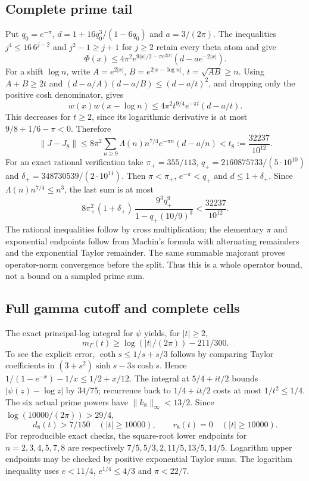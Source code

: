 \documentclass[11pt]{article}
\numberwithin{equation}{section}
\begin{document}
\subsection{Complete prime tail}
Put $q_0=e^{-\pi}$, $d=1+16q_0^3/(1-6q_0)$ and $a=3/(2\pi)$.
The inequalities $j^4\le16\,6^{j-2}$ and $j^2-1\ge j+1$ for $j\ge2$
retain every theta atom and give
\[
 \Phi(x)\le4\pi^2e^{9|x|/2-\pi e^{2|x|}}(d-ae^{-2|x|}).
\]
For a shift $\log n$, write $A=e^{2|x|}$, $B=e^{2|x-\log n|}$,
$t=\sqrt{AB}\ge n$. Using $A+B\ge2t$ and
$(d-a/A)(d-a/B)\le(d-a/t)^2$, and dropping only the positive
cosh denominator, gives
\[
 w(x)w(x-\log n)\le4\pi^2t^{9/4}e^{-\pi t}(d-a/t).
\]
This decreases for $t\ge2$, since its logarithmic derivative is at
most $9/8+1/6-\pi<0$. Therefore
\begin{equation}\label{primebound}
 \|J-J_8\|\le8\pi^2\sum_{n\ge9}
       \Lambda(n)n^{7/4}e^{-\pi n}(d-a/n)
       <t_8:=\frac{32237}{10^{12}}.
\end{equation}
For an exact rational verification take
$\pi_+=355/113$, $q_+=2160875733/(5\cdot10^{10})$ and
$\delta_+=348730539/(2\cdot10^{11})$. Then $\pi<\pi_+$,
$e^{-\pi}<q_+$ and $d\le1+\delta_+$. Since
$\Lambda(n)n^{7/4}\le n^3$, the last sum is at most
\[
 8\pi_+^2(1+\delta_+)\,
       \frac{9^3q_+^9}{1-q_+(10/9)^3}<\frac{32237}{10^{12}}.
\]
The rational inequalities follow by cross multiplication; the elementary
$\pi$ and exponential endpoints follow from Machin's formula with
alternating remainders and the exponential Taylor remainder. The same
summable majorant proves operator-norm convergence before the split.
Thus this is a whole operator bound, not a bound on a sampled prime sum.

\subsection{Full gamma cutoff and complete cells}
The exact principal-log integral for $\psi$ \cite[5.9.13]{DLMF}
yields, for $|t|\ge2$,
\[
 m_\Gamma(t)\ge\log(|t|/(2\pi))-211/300.
\]
To see the explicit error, $\coth s\le1/s+s/3$ follows by comparing
Taylor coefficients in $(3+s^2)\sinh s-3s\cosh s$. Hence
$1/(1-e^{-x})-1/x\le1/2+x/12$. The integral at $5/4+it/2$ bounds
$|\psi(z)-\log z|$ by $34/75$; recurrence back to $1/4+it/2$
costs at most $1/t^2\le1/4$. The six actual prime powers have
$\|k_8\|_\infty<13/2$. Since $\log(10000/(2\pi))>29/4$,
\begin{equation}\label{cutoff}
 d_8(t)>7/150\quad(|t|\ge10000),\qquad r_8(t)=0\quad(|t|\ge10000).
\end{equation}
For reproducible exact checks, the square-root lower endpoints for
$n=2,3,4,5,7,8$ are respectively $7/5,5/3,2,11/5,13/5,14/5$.
Logarithm upper endpoints may be checked by positive exponential
Taylor sums. The logarithm inequality uses $e<11/4$,
$e^{1/4}\le4/3$ and $\pi<22/7$.
\end{document}
